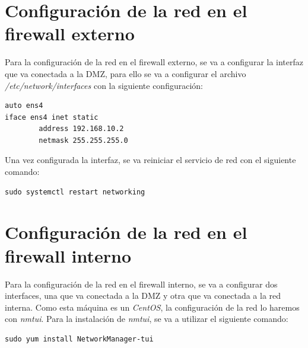 \documentclass[11pt]{report}
\begin{document}
\section{Configuración de la red en el firewall externo}
Para la configuración de la red en el firewall externo, se va a configurar la interfaz que
va conectada a la DMZ, para ello se va a configurar el archivo \emph{/etc/network/interfaces}
con la siguiente configuración:
\begin{verbatim}
auto ens4
iface ens4 inet static
        address 192.168.10.2
        netmask 255.255.255.0
\end{verbatim}

Una vez configurada la interfaz, se va reiniciar el servicio de red con el siguiente comando: \\
\begin{BVerbatim}
sudo systemctl restart networking
\end{BVerbatim}

\cleardoublepage

\section{Configuración de la red en el firewall interno}
Para la configuración de la red en el firewall interno, se va a configurar dos interfaces, una
que va conectada a la DMZ y otra que va conectada a la red interna. Como esta máquina es un \emph{CentOS},
la configuración de la red lo haremos con \emph{nmtui}. Para la instalación de \emph{nmtui}, se va a utilizar
el siguiente comando:
\begin{BVerbatim}
sudo yum install NetworkManager-tui
\end{BVerbatim}
\end{document}
